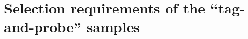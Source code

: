 \clearpage
\chapter{Selection requirements of the ``tag-and-probe'' samples}
\label{app:TagAndProbeRequirements}

\renewcommand{\arraystretch}{1.4}
\begin{table}[!h]
\centering
\caption{Event selection cuts for the muon ``tag-and-probe'' samples (T\&P signal region sample and T\&P lepton veto inverted control region sample) that are used to estimate the uncertainty on the muon scale factor \muonscalefactor.}
\label{tab:MuonTagAndProbeSample}
\end{table}
